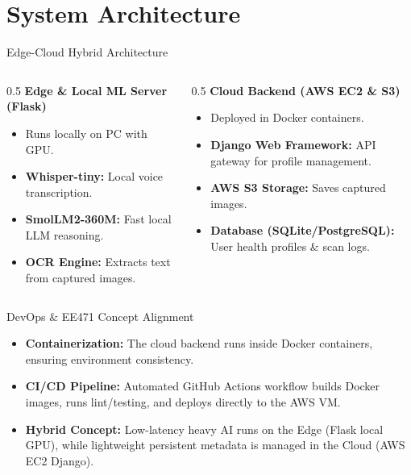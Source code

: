 \section{System Architecture}

\begin{frame}{Edge-Cloud Hybrid Architecture}
    \begin{columns}
        \begin{column}{0.5\textwidth}
            \textbf{Edge \& Local ML Server (Flask)}
            \begin{itemize}
                \item Runs locally on PC with GPU.
                \item \textbf{Whisper-tiny:} Local voice transcription.
                \item \textbf{SmolLM2-360M:} Fast local LLM reasoning.
                \item \textbf{OCR Engine:} Extracts text from captured images.
            \end{itemize}
        \end{column}
        
        \begin{column}{0.5\textwidth}
            \textbf{Cloud Backend (AWS EC2 \& S3)}
            \begin{itemize}
                \item Deployed in Docker containers.
                \item \textbf{Django Web Framework:} API gateway for profile management.
                \item \textbf{AWS S3 Storage:} Saves captured images.
                \item \textbf{Database (SQLite/PostgreSQL):} User health profiles \& scan logs.
            \end{itemize}
        \end{column}
    \end{columns}
\end{frame}

\begin{frame}{DevOps \& EE471 Concept Alignment}
    \begin{itemize}
        \item \textbf{Containerization:} The cloud backend runs inside Docker containers, ensuring environment consistency.
        \item \textbf{CI/CD Pipeline:} Automated GitHub Actions workflow builds Docker images, runs lint/testing, and deploys directly to the AWS VM.
        \item \textbf{Hybrid Concept:} Low-latency heavy AI runs on the Edge (Flask local GPU), while lightweight persistent metadata is managed in the Cloud (AWS EC2 Django).
    \end{itemize}
\end{frame}
